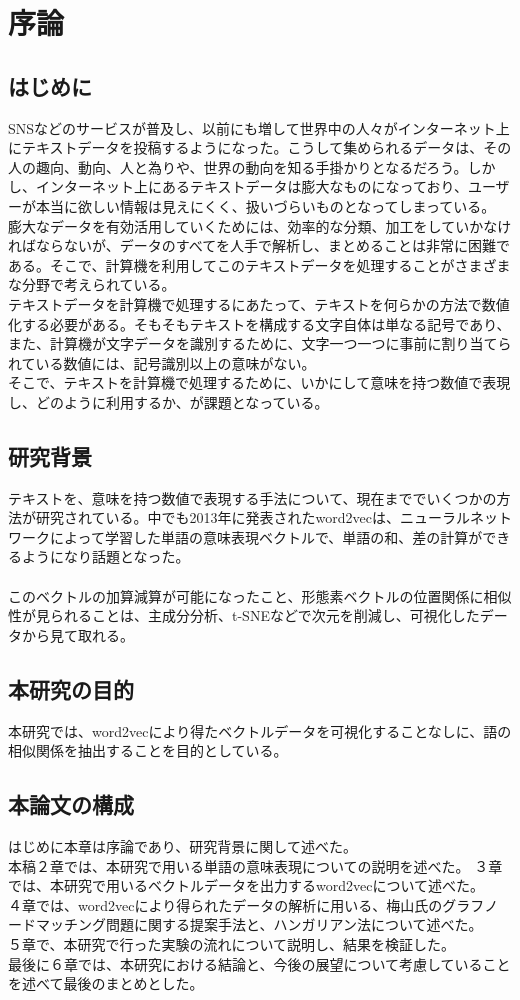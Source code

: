 \chapter{序論}

\section{はじめに}
SNSなどのサービスが普及し、以前にも増して世界中の人々がインターネット上にテキストデータを投稿するようになった。こうして集められるデータは、その人の趣向、動向、人と為りや、世界の動向を知る手掛かりとなるだろう。しかし、インターネット上にあるテキストデータは膨大なものになっており、ユーザーが本当に欲しい情報は見えにくく、扱いづらいものとなってしまっている。\\
膨大なデータを有効活用していくためには、効率的な分類、加工をしていかなければならないが、データのすべてを人手で解析し、まとめることは非常に困難である。そこで、計算機を利用してこのテキストデータを処理することがさまざまな分野で考えられている。
\\
テキストデータを計算機で処理するにあたって、テキストを何らかの方法で数値化する必要がある。そもそもテキストを構成する文字自体は単なる記号であり、また、計算機が文字データを識別するために、文字一つ一つに事前に割り当てられている数値には、記号識別以上の意味がない。\\
そこで、テキストを計算機で処理するために、いかにして意味を持つ数値で表現し、どのように利用するか、が課題となっている。
\\
\section{研究背景}
テキストを、意味を持つ数値で表現する手法について、現在まででいくつかの方法が研究されている。中でも2013年に発表されたword2vecは、ニューラルネットワークによって学習した単語の意味表現ベクトルで、単語の和、差の計算ができるようになり話題となった。\\
\\
このベクトルの加算減算が可能になったこと、形態素ベクトルの位置関係に相似性が見られることは、主成分分析、t-SNEなどで次元を削減し、可視化したデータから見て取れる。
\\
\section{本研究の目的}
本研究では、word2vecにより得たベクトルデータを可視化することなしに、語の相似関係を抽出することを目的としている。
\\
\section{本論文の構成}
はじめに本章は序論であり、研究背景に関して述べた。\\
本稿２章では、本研究で用いる単語の意味表現についての説明を述べた。
３章では、本研究で用いるベクトルデータを出力するword2vecについて述べた。\\
４章では、word2vecにより得られたデータの解析に用いる、梅山氏のグラフノードマッチング問題に関する提案手法と、ハンガリアン法について述べた。\\
５章で、本研究で行った実験の流れについて説明し、結果を検証した。\\
最後に６章では、本研究における結論と、今後の展望について考慮していることを述べて最後のまとめとした。\\

